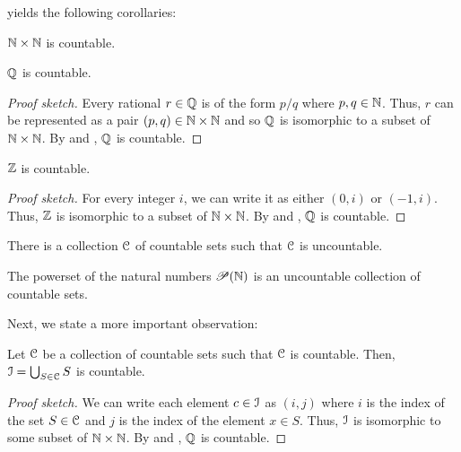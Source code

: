 \documentclass[11pt,usenames, dvipsnames]{article}
\DeclareRobustCommand{\euscr}[1]{%
  \text{\usefont{U}{eus}{m}{n}#1}%
}
\begin{document}
 yields the following corollaries:

\begin{corollary}
  $\mathbb{N} \times \mathbb{N}$ is countable.
\end{corollary}

\begin{corollary}
  $\mathbb{Q}$ is countable.
\end{corollary}

\begin{proof}[Proof sketch]
  Every rational $r \in \mathbb{Q}$ is of the form $p/q$ where $p, q \in \mathbb{N}$. Thus, $r$ can be represented as a pair $(p, q) \in \mathbb{N} \times \mathbb{N}$ and so $\mathbb{Q}$ is isomorphic to a subset of $\mathbb{N} \times \mathbb{N}$. By  and , $\mathbb{Q}$ is countable.
\end{proof}

\begin{corollary}
  $\mathbb{Z}$ is countable.
\end{corollary}

\begin{proof}[Proof sketch]
  For every integer $i$, we can write it as either $(0, i)$ or $(-1, i)$. Thus, $\mathbb{Z}$ is isomorphic to a subset of $\mathbb{N} \times \mathbb{N}$. By  and , $\mathbb{Q}$ is countable.
\end{proof}

\begin{theorem}
  There is a collection $\conn$ of countable sets such that $\conn$ is uncountable.
\end{theorem}

\begin{example}
  The powerset of the natural numbers $\mathscr{P}(\mathbb{N})$ is an uncountable collection of countable sets.
\end{example}

Next, we state a more important observation:

\begin{theorem}
  Let $\conn$ be a collection of countable sets such that $\conn$ is countable. Then, $\euscr{I} = \bigcup_{S \in \conn}{S}$ is countable.
\end{theorem}

\begin{proof}[Proof sketch]
  We can write each element $c \in \euscr{I}$ as $(i, j)$ where $i$ is the index of the set $S \in \conn$ and $j$ is the index of the element $x \in S$. Thus, $\euscr{I}$ is isomorphic to some subset of $\mathbb{N} \times \mathbb{N}$. By  and , $\mathbb{Q}$ is countable.
\end{proof}
\end{document}
